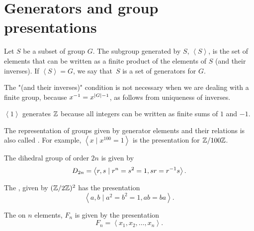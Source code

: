 \documentclass[11pt]{scrreport}
\begin{document}
\section{Generators and group presentations}
\begin{definition}
    Let $S$ be a subset of group $G$. The subgroup generated by $S$, $\left<S\right>$, is the set of elements that can be written as a finite product of the elements of $S$ (and their inverses). If $\left<S\right> = G$, we say that $S$ is a set of generators for $G$. 
\end{definition}
\begin{remark}
    The "(and their inverses)" condition is not necessary when we are dealing with a finite group, because $x^{-1} = x^{|G|-1}$, as follows from uniqueness of inverses.
\end{remark}
\begin{example}
    $\left<1\right>$ generates $\mathbb Z$ because all integers can be written as finite sums of $1$ and $-1$.
\end{example}
\begin{definition}
    The representation of groups given by generator elements and their relations is also called . For example, $\left<x \mid x^{100}=1\right>$ is the presentation for $\mathbb Z/100\mathbb Z$.
\end{definition}
\begin{example}
    The dihedral group of order $2n$ is given by \[D_{2n}=\left<r,s\mid r^n = s^2 = 1, sr = r^{-1} s\right>.\]
\end{example}
\begin{example}
    The , given by $(\mathbb Z/2\mathbb Z)^2$ has the presentation \[\left<a,b\mid a^2=b^2=1, ab=ba\right>.\]
\end{example}
\begin{example}
    The  on $n$ elements, $F_n$ is given by the presentation \[F_n=\left<x_1,x_2,\dots,x_n\right>.\]
\end{example}
\end{document}
